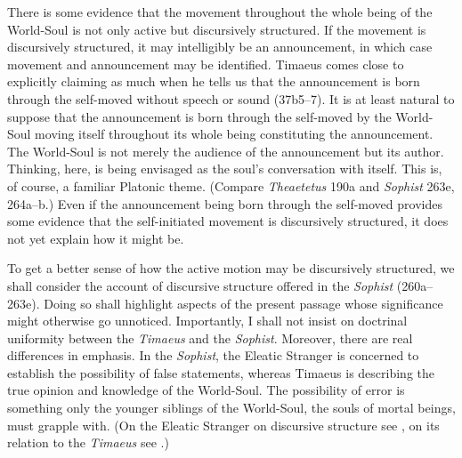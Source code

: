 There is some evidence that the movement throughout the whole being of the World-Soul is not only active but discursively structured. If the movement is discursively structured, it may intelligibly be an announcement, in which case movement and announcement may be identified. Timaeus comes close to explicitly claiming as much when he tells us that the announcement is born through the self-moved without speech or sound (37b5--7). It is at least natural to suppose that the announcement is born through the self-moved by the World-Soul moving itself throughout its whole being constituting the announcement. The World-Soul is not merely the audience of the announcement but its author. Thinking, here, is being envisaged as the soul's conversation with itself. This is, of course, a familiar Platonic theme. (Compare \emph{Theaetetus} 190a and \emph{Sophist} 263e, 264a--b.) Even if the announcement being born through the self-moved provides some evidence that the self-initiated movement is discursively structured, it does not yet explain how it might be.

To get a better sense of how the active motion may be discursively structured, we shall consider the account of discursive structure offered in the \emph{Sophist} (260a--263e). Doing so shall highlight aspects of the present passage whose significance might otherwise go unnoticed. Importantly, I shall not insist on doctrinal uniformity between the \emph{Timaeus} and the \emph{Sophist}. Moreover, there are real differences in emphasis. In the \emph{Sophist}, the Eleatic Stranger is concerned to establish the possibility of false statements, whereas Timaeus is describing the true opinion and knowledge of the World-Soul. The possibility of error is something only the younger siblings of the World-Soul, the souls of mortal beings, must grapple with. (On the Eleatic Stranger on discursive structure see \citealt[]{Frede:1992ec}, on its relation to the \emph{Timaeus} see \citealt[]{Betegh:2019fq}.)

